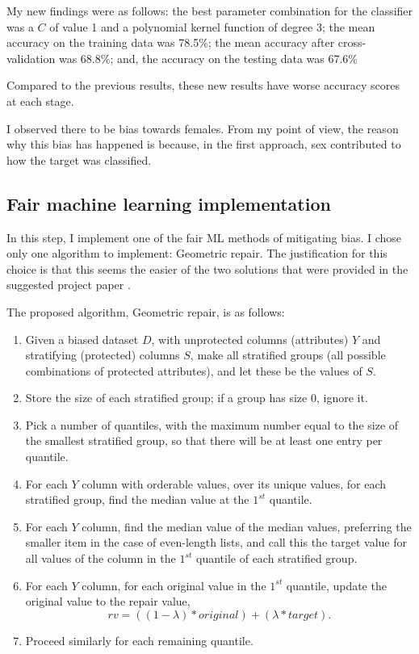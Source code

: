 \documentclass[conference]{IEEEtran}
\begin{document}
My new findings were as follows: the best parameter combination for the classifier was a $C$ of value 1 and a polynomial kernel function of degree 3; the mean accuracy on the training data was 78.5\%; the mean accuracy after cross-validation was 68.8\%; and, the accuracy on the testing data was 67.6\%

Compared to the previous results, these new results have worse accuracy scores at each stage.

I observed there to be bias towards females. From my point of view, the reason why this bias has happened is because, in the first approach, sex contributed to how the target was classified.

\subsection{Fair machine learning implementation}
In this step, I implement one of the fair ML methods of mitigating bias. I chose only one algorithm to implement: Geometric repair. The justification for this choice is that this seems the easier of the two solutions that were provided in the suggested project paper \cite{Feldman2015ComputationalFP}.

The proposed algorithm, Geometric repair, is as follows:
\begin{enumerate}
    \item Given a biased dataset $D$, with unprotected columns (attributes) $Y$ and stratifying (protected) columns $S$, make all stratified groups (all possible combinations of protected attributes), and let these be the values of $S$.
    \item Store the size of each stratified group; if a group has size 0, ignore it.
    \item Pick a number of quantiles, with the maximum number equal to the size of the smallest stratified group, so that there will be at least one entry per quantile. 
    \item For each $Y$ column with orderable values, over its unique values, for each stratified group, find the median value at the $1^{st}$ quantile.
    \item For each $Y$ column, find the median value of the median values, preferring the smaller item in the case of even-length lists, and call this the target value for all values of the column in the $1^{st}$ quantile of each stratified group.
    \item For each $Y$ column, for each original value in the $1^{st}$ quantile, update the original value to the repair value, $$rv = ((1 - \lambda) * original) + (\lambda * target).$$
    \item Proceed similarly for each remaining quantile.     
\end{enumerate}
\end{document}
